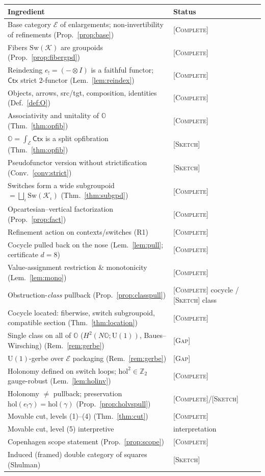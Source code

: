 \documentclass[11pt]{article}
\theoremstyle{definition}
\theoremstyle{remark}
\newcommand{\K}{\mathcal K}
\newcommand{\Ecat}{\mathcal E}
\newcommand{\Oc}{\mathbb O}
\newcommand{\Sw}{\mathrm{Sw}}
\newcommand{\Ctx}{\mathsf{Ctx}}
\newcommand{\U}{\mathrm{U}}
\newcommand{\hol}{\mathrm{hol}}
\newcommand{\Zt}{\mathbb Z_2}
\newcommand{\pushf}[1]{{#1}_{!}}
\newcommand{\STC}{{\normalfont\textsc{[Complete]}}}
\newcommand{\STS}{{\normalfont\textsc{[Sketch]}}}
\newcommand{\STG}{{\normalfont\textsc{[Gap]}}}
\begin{document}
\begin{center}\small
\begin{tabular}{p{7.9cm}l}
\toprule
Ingredient & Status\\
\midrule
Base category $\Ecat$ of enlargements; non-invertibility of refinements (Prop.~\ref{prop:base}) & \STC\\
Fibers $\Sw(\K)$ are groupoids (Prop.~\ref{prop:fibergpd}) & \STC\\
Reindexing $\pushf e=(-\otimes I)$ is a faithful functor; $\Ctx$ strict $2$-functor (Lem.~\ref{lem:reindex}) & \STC\\
Objects, arrows, src/tgt, composition, identities (Def.~\ref{def:O}) & \STC\\
Associativity and unitality of $\Oc$ (Thm.~\ref{thm:opfib}) & \STC\\
$\Oc=\int_\Ecat\Ctx$ is a split opfibration (Thm.~\ref{thm:opfib}) & \STS{} \cite{SGA1,JacobsBook,Johnstone}\\
Pseudofunctor version without strictification (Conv.~\ref{conv:strict}) & \STS{} \cite{SGA1,Johnstone}\\
Switches form a wide subgroupoid $=\bigsqcup_\iota\Sw(\K_\iota)$ (Thm.~\ref{thm:subgpd}) & \STC\\
Opcartesian--vertical factorization (Prop.~\ref{prop:fact}) & \STC\\
Refinement action on contexts/switches (R1) & \STC\\
Cocycle pulled back on the nose (Lem.~\ref{lem:pull}; certificate $d=8$) & \STC\\
Value-assignment restriction \& monotonicity (Lem.~\ref{lem:mono}) & \STC\\
Obstruction-\emph{class} pullback (Prop.~\ref{prop:classpull}) & \STC{} cocycle / \STS{} class \cite{Brown,Weibel}\\
Cocycle located: fiberwise, switch subgroupoid, compatible section (Thm.~\ref{thm:location}) & \STC\\
Single class on all of $\Oc$ ($H^2(N\Oc;\U(1))$, Baues--Wirsching) (Rem.~\ref{rem:gerbe}) & \STG\\
$\U(1)$-gerbe over $\Ecat$ packaging (Rem.~\ref{rem:gerbe}) & \STG\\
Holonomy defined on switch loops; $\hol^2\in\Zt$ gauge-robust (Lem.~\ref{lem:holinv}) & \STC{} \cite{paperD}\\
Holonomy $\neq$ pullback; preservation $\hol(\pushf e\gamma)=\hol(\gamma)$ (Prop.~\ref{prop:holvspull}) & \STC{}/\STS\\
Movable cut, levels (1)--(4) (Thm.~\ref{thm:cut}) & \STC\\
Movable cut, level (5) interpretive & interpretation\\
Copenhagen scope statement (Prop.~\ref{prop:scope}) & \STC\\
Induced (framed) double category of squares (Shulman) & \STS{} \cite{Shulman}\\
\bottomrule
\end{tabular}
\end{center}
\end{document}

